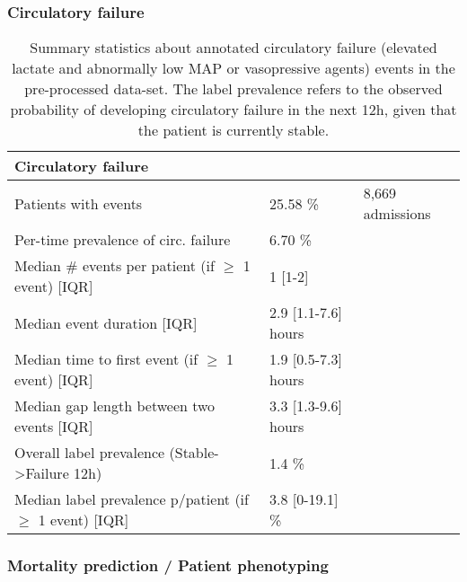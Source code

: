 \documentclass{article}
\begin{document}
\FloatBarrier

\subsubsection*{Circulatory failure}

\begin{table}[ht!]
\caption{Summary statistics about annotated circulatory failure (elevated lactate and abnormally low MAP or vasopressive agents) events in the pre-processed data-set. The label prevalence refers to the observed probability of developing circulatory failure in the next 12h, given that the patient is currently stable.}
\footnotesize
\begin{center}
{\selectfont\small
\begin{tabular}{lll}
\toprule
\textbf{Circulatory failure} & & \\
\midrule
Patients with events & 25.58 \%  & 8,669 admissions \\
Per-time prevalence of circ. failure & 6.70 \% & \\ 
Median \# events per patient (if $\geq$ 1 event) [IQR] & 1 [1-2] & \\
Median event duration [IQR] & 2.9 [1.1-7.6] hours & \\
Median time to first event (if $\geq$ 1 event) [IQR] & 1.9 [0.5-7.3] hours  & \\
Median gap length between two events [IQR] & 3.3 [1.3-9.6] hours & \\
\midrule
Overall label prevalence (Stable->Failure 12h) & 1.4 \% & \\
Median label prevalence p/patient (if $\geq$ 1 event) [IQR] & 3.8 [0-19.1] \%  \\
\bottomrule
\end{tabular}}
\end{center}
\label{tab:appendix-resp-failure-statistics}
\end{table}

\FloatBarrier

\subsubsection*{Mortality prediction / Patient phenotyping}
\end{document}
